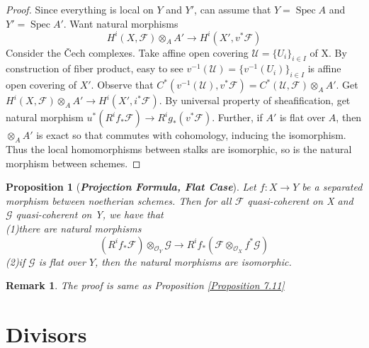 \documentclass{ctexart}
\newtheorem{remark}{Remark}[section]
\newtheorem{proposition}{Proposition}[section]
\newcommand{\spec}{\operatorname{Spec}}
\begin{document}
\begin{proof}
    Since everything is local on $Y$ and $Y'$, can assume that $Y = \spec A$ and $Y' = \spec A'$.
    Want natural morphisms 
    \begin{equation*}
        H^{i}(X, \mathcal{F}) \otimes_{A} A' \longrightarrow H^{i}(X', v^{\ast}\mathcal{F})
    \end{equation*}
    Consider the Čech complexes.
    Take affine open covering $\mathcal{U} = \{U_{i}\}_{i\in I}$ of X.
    By construction of fiber product, easy to see $v^{-1}(\mathcal{U}) = \{v^{-1}(U_{i})\}_{i\in I}$ is affine open covering of $X'$.
    Observe that $C^{\ast}(v^{-1}(\mathcal{U}), v^{\ast}\mathcal{F}) = C^{\ast}(\mathcal{U}, \mathcal{F}) \otimes_{A} A'$.
    Get $H^{i}(X, \mathcal{F}) \otimes_{A} A' \longrightarrow H^{i}(X', i^{\ast}\mathcal{F})$.
    By universal property of sheafification, get natural morphism $u^{\ast}(R^{i}f_{\ast}\mathcal{F}) \longrightarrow R^{i}g_{\ast}(v^{\ast}\mathcal{F})$.
    Further, if $A'$ is flat over $A$,
    then $\otimes_{A} A'$ is exact so that commutes with cohomology, inducing the isomorphism.
    Thus the local homomorphisms between stalks are isomorphic, so is the natural morphism between schemes.
\end{proof}
\begin{proposition}[\textbf{\emph{Projection Formula, Flat Case}}]
    Let $f: X \longrightarrow Y$ be a separated morphism between noetherian schemes.
    Then for all $\mathcal{F}$ quasi-coherent on X and $\mathcal{G}$ quasi-coherent on Y, we have that \\
    (1)there are natural morphisms 
    \begin{equation*}
        (R^{i}f_{\ast}\mathcal{F}) \otimes_{\mathcal{O}_{Y}} \mathcal{G} \longrightarrow R^{i}f_{\ast}(\mathcal{F} \otimes_{\mathcal{O}_{X}} f^{\ast}\mathcal{G})
    \end{equation*}
    (2)if $\mathcal{G}$ is flat over $Y$, then the natural morphisms are isomorphic.
    \label{Proposition 7.12}
\end{proposition}
\begin{remark}
    The proof is same as Proposition \ref{Proposition 7.11}
\end{remark}

\section{Divisors}
\label{section:Divisors}
\end{document}
